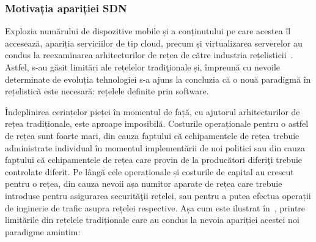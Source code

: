 \subsubsection{Motivația apariției SDN}

Explozia numărului de dispozitive mobile și a conținutului pe care acestea îl accesează, apariția serviciilor de tip cloud, precum și virtualizarea serverelor au condus la reexaminarea arhitecturilor de rețea de către industria rețelisticii~\cite{ome2012software}. Astfel, s-au găsit limitări ale rețelelor tradiţionale și, împreună cu nevoile determinate de evoluția tehnologiei s-a ajuns la concluzia că o nouă paradigmă în rețelistică este necesară: rețelele definite prin software.

Îndeplinirea cerințelor pieței în momentul de față, cu ajutorul arhitecturilor de rețea tradiționale, este aproape imposibilă. Costurile operaționale pentru o astfel de rețea sunt foarte mari, din cauza faptului că echipamentele de rețea trebuie administrate individual în momentul implementării de noi politici sau din cauza faptului că echipamentele de rețea care provin de la producători diferiţi trebuie controlate diferit. Pe lângă cele operaționale și costurile de capital au crescut pentru o rețea, din cauza nevoii așa numitor aparate de rețea care trebuie introduse pentru asigurarea securităţii rețelei, sau pentru a putea efectua operații de inginerie de trafic asupra rețelei respective. Așa cum este ilustrat în~\cite{ome2012software}, printre limitările din rețelele tradiționale care au condus la nevoia apariției acestei noi paradigme amintim:

